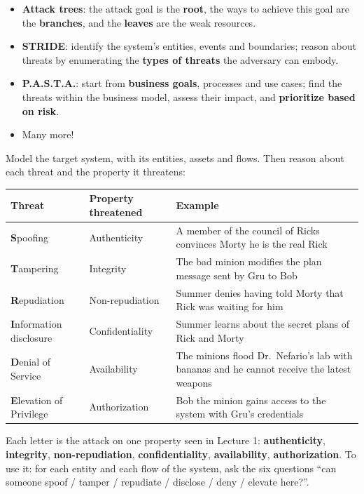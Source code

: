 \begin{defnbox}[title=Threat modelling methodologies]
\begin{itemize}
  \item \textbf{Attack trees}: the attack goal is the \textbf{root}, the ways to achieve this goal
        are the \textbf{branches}, and the \textbf{leaves} are the weak resources.
  \item \textbf{STRIDE}: identify the system's entities, events and boundaries; reason about
        threats by enumerating the \textbf{types of threats} the adversary can embody.
  \item \textbf{P.A.S.T.A.}: start from \textbf{business goals}, processes and use cases; find the
        threats within the business model, assess their impact, and \textbf{prioritize based on
        risk}.
  \item Many more!
\end{itemize}
\end{defnbox}

\begin{defnbox}[title={STRIDE (by Microsoft)}]
Model the target system, with its entities, assets and flows. Then reason about each threat and
the property it threatens:
\begin{center}
\small
\begin{tabularx}{\linewidth}{l|l|X}
\textbf{Threat} & \textbf{Property threatened} & \textbf{Example} \\ \hline
\textbf{S}poofing & Authenticity & A member of the council of Ricks convinces Morty he is the
real Rick \\
\textbf{T}ampering & Integrity & The bad minion modifies the plan message sent by Gru to Bob \\
\textbf{R}epudiation & Non-repudiation & Summer denies having told Morty that Rick was waiting
for him \\
\textbf{I}nformation disclosure & Confidentiality & Summer learns about the secret plans of Rick
and Morty \\
\textbf{D}enial of Service & Availability & The minions flood Dr.\ Nefario's lab with bananas and
he cannot receive the latest weapons \\
\textbf{E}levation of Privilege & Authorization & Bob the minion gains access to the system with
Gru's credentials
\end{tabularx}
\end{center}
\end{defnbox}

\begin{rembox}[title=STRIDE is the negation of the properties]
Each letter is the attack on one property seen in Lecture 1: \textbf{authenticity},
\textbf{integrity}, \textbf{non-repudiation}, \textbf{confidentiality}, \textbf{availability},
\textbf{authorization}. To use it: for each entity and each flow of the system, ask the six
questions ``can someone spoof / tamper / repudiate / disclose / deny / elevate here?''.
\end{rembox}

